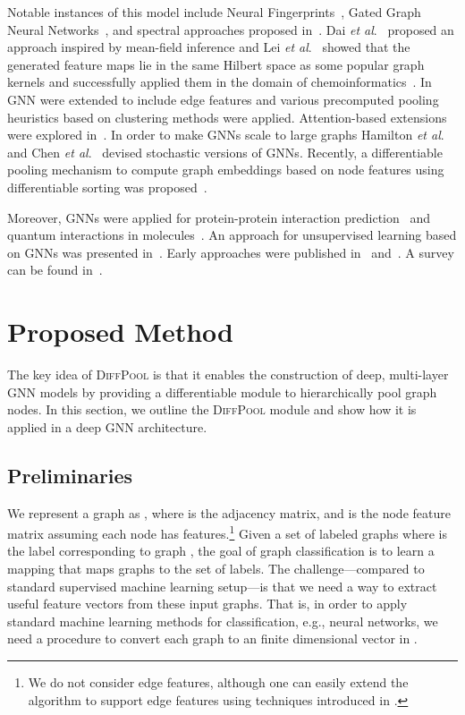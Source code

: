 \documentclass{article}
\newcommand{\name}{\textsc{DiffPool}\xspace}
\newcommand{\etal}{\textit{et al}.~}
\begin{document}
{Notable instances of this model include Neural
Fingerprints~\cite{Duv+2015}, Gated Graph Neural
Networks~\cite{Li+2016}, and spectral approaches proposed
in~\cite{Bru+2014,Def+2015,kipf2017semi}. Dai \etal\cite{dai2016discriminative}
proposed an approach inspired by mean-field inference
and Lei \etal\cite{Lei+2017} showed that the generated
feature maps lie in the same Hilbert space as some popular graph
kernels and successfully applied them in the domain of
chemoinformatics~\cite{Jin+2018}. In~\cite{simonovsky2017dynamic} GNN were extended to include edge features and various precomputed pooling heuristics based on clustering methods were applied. Attention-based extensions were explored in~\cite{Vel+2018}. In order to make GNNs scale to large graphs Hamilton \etal\cite{hamilton2017inductive} and Chen \etal\cite{Che+2018} devised stochastic versions of GNNs. Recently, a differentiable pooling mechanism to compute graph embeddings based on node features using differentiable sorting was proposed~\cite{zhang2018end}.

Moreover, GNNs were applied for protein-protein
interaction prediction~\cite{Fou+2017} and quantum interactions in
molecules~\cite{Sch+2017}. An approach for unsupervised learning based
on GNNs was presented in~\cite{Gar+2017}. Early
approaches were published in~\cite{Mer+2005} and~\cite{Sca+2009,
Sca+2009a}. A survey can be found in~\cite{Ham+2017a}.

}




 \section{Proposed Method}
\label{sec:proposed}

The key idea of \name is that it enables the construction of deep, multi-layer GNN models by providing a differentiable module to hierarchically pool graph nodes. 
In this section, we outline the \name module and show how it is applied in a deep GNN architecture.



\subsection{Preliminaries}
\label{sec:setting}

We represent a graph  as , where  is the adjacency matrix, and  is the node feature matrix assuming each node has  features.\footnote{We do not consider edge features, although one can easily extend the algorithm to support edge features using techniques introduced in \cite{simonovsky2017dynamic}.}
Given a set of labeled graphs  where  is the label corresponding to graph , the goal of graph classification is to learn a mapping  that maps graphs to the set of labels. 
The challenge---compared to standard supervised machine learning setup---is that we need a way to extract useful feature vectors from these input graphs.
That is, in order to apply standard machine learning methods for classification, e.g., neural networks, we need a procedure to convert each graph to an finite dimensional vector in .
\end{document}
